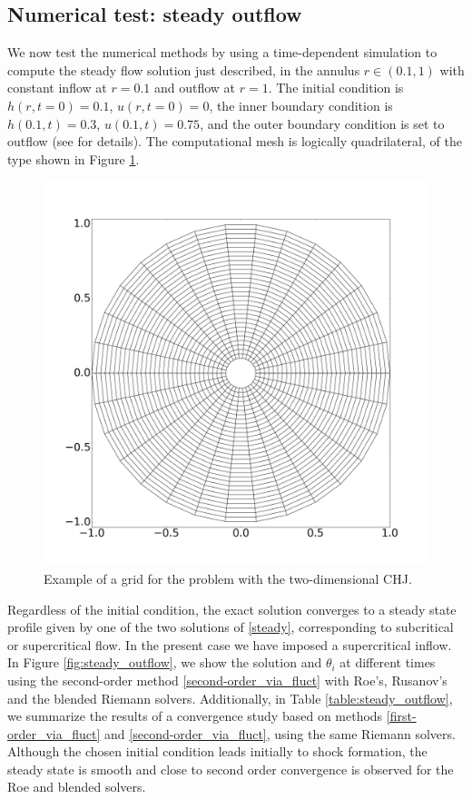 \documentclass[preprint, 11pt]{article}
\begin{document}
\subsection{Numerical test: steady outflow}\label{sec:steady_outflow}
We now test the numerical methods by using a time-dependent simulation
to compute the steady flow solution just described, 
in the annulus $r\in(0.1,1)$ with constant inflow at $r=0.1$ and outflow at $r=1$.
The initial condition is
$h(r,t=0)=0.1$, $u(r,t=0)=0$, the inner boundary condition is $h(0.1,t)=0.3$, $u(0.1,t)=0.75$,
and the outer boundary condition is set to outflow
(see \cite[\S 21.8.5]{leveque2002finite} for details).
The computational mesh is logically quadrilateral, of the type shown in
Figure \ref{fig:mesh_chj}.
\begin{figure}[!h]
  \centering 
  \includegraphics[scale=0.15]{figures/mesh.png}
  \caption{
    Example of a grid for the problem with the two-dimensional CHJ.
    \label{fig:mesh_chj}}
\end{figure}
Regardless of the initial condition, the exact solution converges to a
steady state profile given by one of the two solutions of \eqref{steady},
corresponding to subcritical or supercritical flow.  In the present case we
have imposed a supercritical inflow.
In Figure \ref{fig:steady_outflow}, we show the solution and $\theta_i$ at different times using
the second-order method \eqref{second-order_via_fluct}
with Roe's, Rusanov's and the blended Riemann solvers.  
Additionally, in Table \ref{table:steady_outflow}, we summarize the results of a convergence study
based on methods \eqref{first-order_via_fluct} and
\eqref{second-order_via_fluct}, using the same Riemann solvers.
Although the chosen initial
condition leads initially to shock formation, the steady state is smooth and close to
second order convergence is observed for the Roe and blended solvers.
\end{document}
